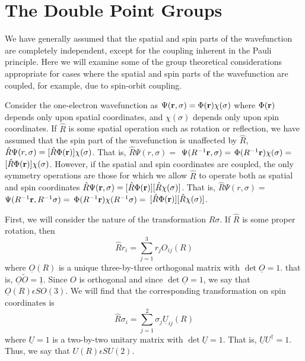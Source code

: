 \section{The Double Point Groups}

We have generally assumed that the spatial and spin parts of the 
wavefunction are completely independent, except for the coupling 
inherent in the Pauli principle.  Here we will examine some of the 
group theoretical considerations appropriate for cases where the 
spatial and spin parts of the wavefunction are coupled, for example, 
due to spin-orbit coupling.

Consider the one-electron wavefunction as $\Psi({\bf r}, \sigma) = 
\Phi( {\bf r} ) \chi(\sigma)$ where $\Phi({\bf r})$ depends only upon 
spatial coordinates, and $\chi(\sigma)$ depends only upon spin 
coordinates.  If ${\hat{R}}$ is some spatial operation such as 
rotation or reflection, we have assumed that the spin part of the 
wavefunction is unaffected by ${\hat{R}}$, 
${\hat{R}} \Psi (r,\sigma) = [ {\hat{R}}\Phi({\bf r} ) ] \chi( 
\sigma)$.  That is, ${\hat{R}} \Psi (r,\sigma) =$ $\Psi (R^{-1} {\bf 
r} , \sigma ) =$ $\Phi(R^{-1} {\bf r} ) \chi (\sigma )=$ $[{\hat{R}} 
\Phi ( {\bf r} ) ] \chi( \sigma )$.  However, if the spatial and spin 
coordinates are coupled, the only symmetry operations are those for 
which we allow ${\hat{R}}$ to operate both as spatial and spin 
coordinates ${\hat{R}} \Psi ( {\bf r},\sigma) = [ {\hat{R}}\Phi({\bf 
r} ) ] [ {\hat{R}} \chi ( \sigma)]$.  That is, ${\hat{R}} \Psi (r,\sigma) =$ 
$\Psi (R^{-1} {\bf r} , R^{-1} \sigma ) =$ $\Phi(R^{-1} {\bf r} ) 
\chi (R^{-1} \sigma )=$ $[{\hat{R}} \Phi ( {\bf r} ) ] [ {\hat{R}} 
\chi( \sigma )]$. 

First, we will consider the nature of the transformation $R \sigma$.  
If ${\hat{R}}$ is some proper rotation, then
\begin{equation}
{\hat{R}} r_i = \sum_{j=1}^{3} r_j O_{ij} (R)
\end{equation}
where $\underline{O}(R)$ is a unique three-by-three orthogonal matrix 
with $\det \underline{O} = 1$.  that is, $\underline{O} {\tilde{O}} = 
\underline{1}$.  Since $O$ is orthogonal and since $\det 
\underline{O} = 1$, we say that $\underline{O}(R) \epsilon SO(3)$.  We 
will find that the corresponding transformation on spin coordinates is
\begin{equation}
{\hat{R}} \sigma_i = \sum_{j=1}^{2} \sigma_j \underline{U}_{ij} (R)
\end{equation}
where $\underline{U} = 1$ is a two-by-two unitary matrix with $\det 
\underline{U} = 1$.  That is, $\underline{U}U^{\dag} = 1$.  Thus, we 
say that $U(R)\epsilon SU(2)$.

